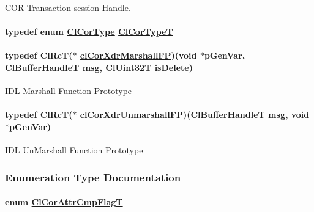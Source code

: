 COR Transaction session Handle. \hypertarget{group__group13_ga9}{
\paragraph[ClCorTypeT]{\setlength{\rightskip}{0pt plus 5cm}typedef enum \hyperlink{group__group13_ga325}{Cl\-Cor\-Type}  \hyperlink{group__group13_ga9}{Cl\-Cor\-Type\-T}}\hfill}
\label{group__group13_ga9}


\hypertarget{group__group13_ga54}{
\paragraph[clCorXdrMarshallFP]{\setlength{\rightskip}{0pt plus 5cm}typedef Cl\-Rc\-T($\ast$ \hyperlink{group__group13_ga54}{cl\-Cor\-Xdr\-Marshall\-FP})(void $\ast$p\-Gen\-Var, Cl\-Buffer\-Handle\-T msg, Cl\-Uint32T is\-Delete)}\hfill}
\label{group__group13_ga54}


IDL Marshall Function Prototype \hypertarget{group__group13_ga55}{
\paragraph[clCorXdrUnmarshallFP]{\setlength{\rightskip}{0pt plus 5cm}typedef Cl\-Rc\-T($\ast$ \hyperlink{group__group13_ga55}{cl\-Cor\-Xdr\-Unmarshall\-FP})(Cl\-Buffer\-Handle\-T msg, void $\ast$p\-Gen\-Var)}\hfill}
\label{group__group13_ga55}


IDL Un\-Marshall Function Prototype 

\subsubsection{Enumeration Type Documentation}
\hypertarget{group__group13_ga327}{
\paragraph[ClCorAttrCmpFlagT]{\setlength{\rightskip}{0pt plus 5cm}enum \hyperlink{group__group13_ga327}{Cl\-Cor\-Attr\-Cmp\-Flag\-T}}\hfill}
\label{group__group13_ga327}


